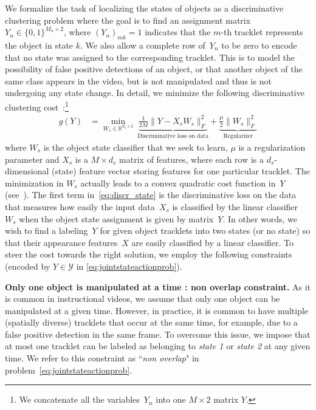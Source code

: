 We formalize the task of localizing the states of objects as a discriminative clustering problem where the goal is to find an assignment matrix~$Y_n\in\{0,1\}^{M_n\times 2}$, where
 $(Y_n)_{mk}=1$ indicates that the $m$-th tracklet represents the object in state $k$. 
 We also allow a complete row of~$Y_n$ to be zero to encode that no state was assigned to the corresponding tracklet. 
 This is to model the possibility of false positive detections of an object, or that another object of the same class appears in the video, but is not manipulated and thus is not undergoing any state change. 
 In detail, we minimize the following discriminative clustering cost~\cite{Bach07diffrac}:\footnote{We concatenate all the variables~$Y_n$ into one $M\!\times\!2$ matrix $Y\!$.}  
\begin{align}
    g(Y) &= \min_{W_{s} \in \mathbb{R}^{d_s \times 2}} \ \underbrace{\frac{1}{2M} \|Y - X_{s} W_{s}\|_F^2}_\text{Discriminative loss on data} + \underbrace{\frac{\mu}{2} \|W_{s}\|_F^2}_\text{Regularizer}
    \label{eq:discr_state} 
\end{align}
where $W_s$ is the object state classifier that we seek to learn, $\mu$ is a regularization parameter and $X_s$ is a $M\!\times\!d_s$ matrix of features, where each row is a $d_s$-dimensional (state) feature vector storing features for one particular tracklet. 
The minimization in $W_s$ actually leads to a convex quadratic cost function in~$Y$ (see~\cite{Bach07diffrac}). 
The first term in~\eqref{eq:discr_state} is the discriminative loss on the data that measures how easily the input data~$X_{s}$ is classified by the linear classifier~$W_{s}$ when the object state assignment is given by matrix~$Y$. 
In other words, we wish to find a labeling~$Y$ for given object tracklets into two states (or no state) so that their appearance features~$X$ are easily classified by a linear classifier. To steer the cost towards the right solution, we employ the following constraints (encoded by $Y \in \mathcal{Y}$ in \eqref{eq:jointstateactionprob}). 

\noindent\textbf{Only one object is manipulated at a time : non overlap constraint.}
As it is common in instructional videos, we assume that only one object can be manipulated at a given time.
However, in practice, it is common to have multiple (spatially diverse) tracklets that occur at the same time, for example, due to a false positive detection in the same frame.
To overcome this issue, we impose that at most one tracklet can be labeled as belonging to \emph{state 1} or \emph{state 2} at any given time.
We refer to this constraint as ``\emph{non overlap}" in problem~\eqref{eq:jointstateactionprob}.

